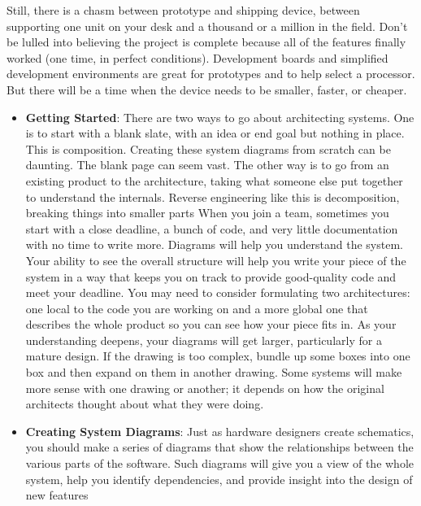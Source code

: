 \documentclass{report}
\begin{document}
\begin{itemize}
            \bigbreak \noindent 
            Still, there is a chasm between prototype and shipping device, between supporting one unit on your desk and a thousand or a million in the field. Don’t be lulled into believing the project is complete because all of the features finally worked (one time, in perfect conditions).
            \bigbreak \noindent 
            Development boards and simplified development environments are great for prototypes and to help select a processor. But there will be a time when the device needs to be smaller, faster, or cheaper.



    \end{itemize}

    \pagebreak 
    \begin{itemize}
        \item \textbf{Getting Started}: There are two ways to go about architecting systems. One is to start with a blank slate, with an idea or end goal but nothing in place. This is composition. Creating these system diagrams from scratch can be daunting. The blank page can seem vast.        
            \bigbreak \noindent 
            The other way is to go from an existing product to the architecture, taking what someone else put together to understand the internals. Reverse engineering like this is decomposition, breaking things into smaller parts
            \bigbreak \noindent 
            When you join a team, sometimes you start with a close deadline, a bunch of code, and very little documentation with no time to write more.
            \bigbreak \noindent 
            Diagrams will help you understand the system. Your ability to see the overall structure will help you write your piece of the system in a way that keeps you on track to provide good-quality code and meet your deadline.
            \bigbreak \noindent 
            You may need to consider formulating two architectures: one local to the code you are working on and a more global one that describes the whole product so you can see how your piece fits in.
            \bigbreak \noindent 
            As your understanding deepens, your diagrams will get larger, particularly for a mature design. If the drawing is too complex, bundle up some boxes into one box and then expand on them in another drawing.
            \bigbreak \noindent 
            Some systems will make more sense with one drawing or another; it depends on how the original architects thought about what they were doing.
        \item \textbf{Creating System Diagrams}: Just as hardware designers create schematics, you should make a series of diagrams that show the relationships between the various parts of the software. Such diagrams will give you a view of the whole system, help you identify dependencies, and provide insight into the design of new features

\end{itemize}
\end{document}

